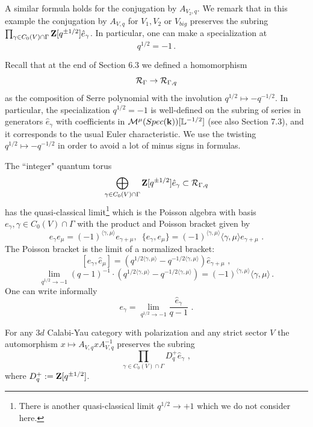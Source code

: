 \documentclass[12pt]{article}
\begin{document}
A similar formula holds for the conjugation by $A_{V_2,q}$. 
We remark that in this example the conjugation by $A_{V,q}$ for $V_1, V_2$ or $V_{big} $ preserves the  subring
$\prod_{\gamma\in C_0(V)\cap \Gamma}{\bf Z}[q^{\pm 1/2}]\hat{e}_{\gamma}$. In particular,
 one can make a specialization at 
 $$q^{1/2}=-1\,.$$
 \begin{rmk} Recall that at the end of Section 6.3 we defined a homomorphism
 $${\cal R}_\Gamma\to {\cal R}_{\Gamma,q}$$
 as the composition of Serre polynomial with the involution $q^{1/2}\mapsto -q^{-1/2}$.
 In particular, the specialization $q^{1/2}=-1$ is well-defined on the subring of series
 in generators $\hat{e}_\gamma$ with coefficients in
 ${\cal M}^{\mu}(Spec({\bf k}))[{\mathbb L}^{-1/2}]$ (see also Section 7.3), and it corresponds
  to the usual Euler characteristic. We  use the twisting $q^{1/2}\mapsto -q^{-1/2}$ in order to
  avoid a lot of minus signs in formulas.
 \end{rmk}
  The ``integer" quantum torus
$$\bigoplus_{\gamma\in C_0(V)\cap \Gamma} {\bf Z}[q^{\pm 1/2}]\hat{e}_{\gamma}\subset {\cal R}_{\Gamma,q}$$ has the quasi-classical limit\footnote{There is another quasi-classical limit $q^{1/2}\to +1$ which we do not consider here.} which is the Poisson algebra with basis ${e}_{\gamma}, \gamma\in C_0(V)\cap \Gamma$ with the product and Poisson bracket
given by
$${e}_{\gamma}{e}_{\mu}=(- 1)^{\langle \gamma,\mu\rangle}e_{\gamma+\mu},\,\,\,\{e_{\gamma},e_{\mu}\}=(- 1)^{\langle \gamma,\mu\rangle}\langle \gamma,\mu\rangle e_{\gamma+\mu}\,\,.$$ 
The Poisson bracket is the limit of a normalized bracket:
$$[\hat{e}_\gamma,\hat{e}_\mu]=\left(q^{1/2\langle \gamma, \mu\rangle}-q^{-1/2\langle \gamma, \mu\rangle}\right)\hat{e}_{\gamma+\mu}\,\,,$$
$$\lim_{q^{1/2}\to -1}
(q-1)^{-1}\cdot\left(q^{1/2\langle \gamma, \mu\rangle}-q^{-1/2\langle \gamma, \mu\rangle}\right)=(- 1)^{\langle \gamma,\mu\rangle}\langle \gamma,\mu\rangle\,.$$
 One can write informally
 $$e_\gamma=\lim_{q^{1/2}\to -1}\frac{\hat{e}_\gamma}{q-1}\,\,.$$
 
\begin{conj} For any $3d$ Calabi-Yau category with polarization and any strict sector $V$ the automorphism $x\mapsto A_{V,q}xA_{V,q}^{-1}$ preserves the subring $$\prod_{\gamma\in C_0(V)\cap \Gamma}D_q^+\hat{e}_{\gamma}\,\,,$$ where
$D_q^+ :={\bf Z}[q^{\pm 1/2}]$.


\end{conj}
\end{document}
